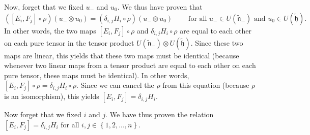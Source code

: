 \documentclass[etingof-lie.tex]{subfiles}
\begin{document}
\begin{verlong}
Now, forget that we fixed $u_{-}$ and $u_{0}$. We thus have proven that%
\[
\left(  \left[  E_{i},F_{j}\right]  \circ\rho\right)  \left(  u_{-}\otimes
u_{0}\right)  =\left(  \delta_{i,j}H_{i}\circ\rho\right)  \left(  u_{-}\otimes
u_{0}\right)  \ \ \ \ \ \ \ \ \ \ \text{for all }u_{-}\in U\left(
\widetilde{\mathfrak{n}}_{-}\right)  \text{ and }u_{0}\in U\left(
\widetilde{\mathfrak{h}}\right)  .
\]
In other words, the two maps $\left[  E_{i},F_{j}\right]  \circ\rho$ and
$\delta_{i,j}H_{i}\circ\rho$ are equal to each other on each pure tensor in
the tensor product $U\left(  \widetilde{\mathfrak{n}}_{-}\right)  \otimes
U\left(  \widetilde{\mathfrak{h}}\right)  $. Since these two maps are linear,
this yields that these two maps must be identical (because whenever two linear
maps from a tensor product are equal to each other on each pure tensor, these
maps must be identical). In other words, $\left[  E_{i},F_{j}\right]
\circ\rho=\delta_{i,j}H_{i}\circ\rho$. Since we can cancel the $\rho$ from
this equation (because $\rho$ is an isomorphism), this yields $\left[
E_{i},F_{j}\right]  =\delta_{i,j}H_{i}$.
\end{verlong}

Now forget that we fixed $i$ and $j$. We have thus proven the relation
$\left[  E_{i},F_{j}\right]  =\delta_{i,j}H_{i}$ for all $i,j\in\left\{
1,2,...,n\right\}  $.

\bigskip
\end{document}
